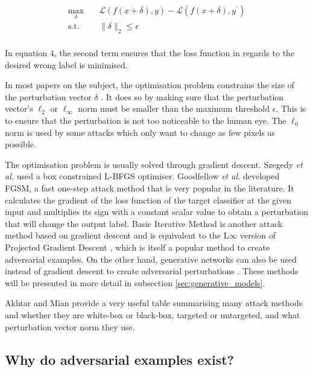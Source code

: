 \begin{equation}
\begin{aligned}
\max_{\delta} \quad & \mathcal{L}(f(x + \delta), y) - \mathcal{L}(f(x + \delta), y^\prime)\\
\textrm{s.t.} \quad& \|\delta\|_2\leq\epsilon   \\
\end{aligned}
\end{equation}

In equation 4, the second term ensures that the loss function in regards to the desired wrong label is minimised.

In most papers on the subject, the optimisation problem constrains the size of the perturbation vector $\delta$ \cite{akhtar, silva_survey, tnnls_survey}. It does so by making sure that the perturbation vector's $\ell_2$ or $\ell_\infty$ norm must be smaller than the maximum threshold $\epsilon$. This is to ensure that the perturbation is not too noticeable to the human eye. The $\ell_0$ norm is used by some attacks \cite{akhtar} which only want to change as few pixels as possible. 

The optimisation problem is usually solved through gradient descent. Szegedy \textit{et al.} \cite{szegedy2014intriguing} used a box constrained L-BFGS optimiser. Goodfellow \textit{et al.} \cite{fgsm} developed FGSM, a fast one-step attack method that is very popular in the literature. It calculates the gradient of the loss function of the target classifier at the given input and multiplies its sign with a constant scalar value to obtain a perturbation that will change the output label. Basic Iterative Method is another attack method based on gradient descent and is equivalent to the L$\infty$ version of Projected Gradient Descent \cite{madry2019deep}, which is itself a popular method to create adversarial examples. On the other hand, generative networks can also be used instead of gradient descent to create adversarial perturbations \cite{upset_angri, zheng_black_box_GAN, GANs_adversarial_attacks}. These methods will be presented in more detail in subsection \ref{sec:generative_models}. 

Akhtar and Mian \cite{akhtar} provide a very useful table summarising many attack methods and whether they are white-box or black-box, targeted or untargeted, and what perturbation vector norm they use.

\subsection{Why do adversarial examples exist?}

